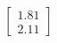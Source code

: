 \documentclass[preview]{standalone}
\begin{document}
\begin{align*}
\begin{bmatrix} 1.81 \\ 2.11 \end{bmatrix}
\end{align*}
\end{document}
